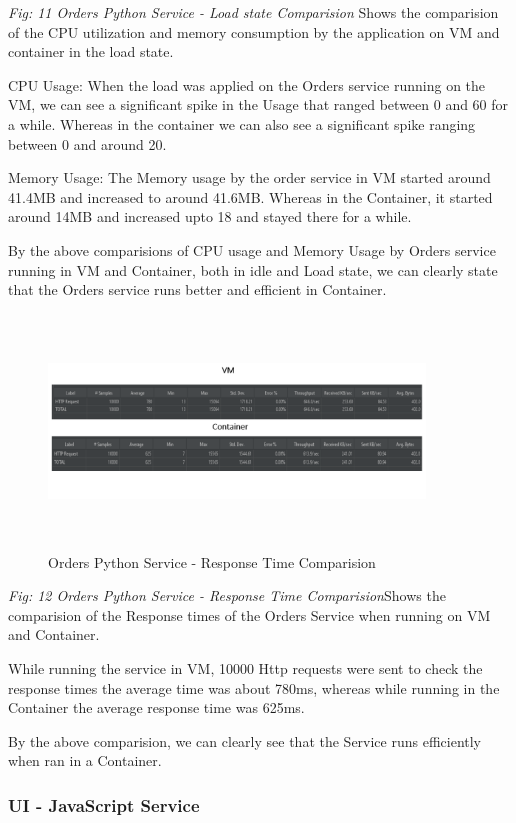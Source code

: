 \emph{Fig: 11 Orders Python Service - Load state Comparision} Shows the comparision of the CPU utilization and memory consumption by the application on VM and container in the load state.

CPU Usage: When the load was applied on the Orders service running on the VM, we can see a significant spike in the Usage that ranged between 0 and 60 for a while. Whereas in the container we can also see a significant spike ranging between 0 and around 20. 

Memory Usage:  The Memory usage by the order service in VM started around 41.4MB and increased to around 41.6MB. Whereas in the Container, it started around 14MB and increased upto 18 and stayed there for a while.

By the above comparisions of CPU usage and Memory Usage by Orders service running in VM and Container, both in idle and Load state, we can clearly state that the Orders service runs better and efficient in Container.

\begin{figure}[!h]
    \centering
    \includegraphics[width=10cm, height=6.2cm]{images/orders-response-comp.png}
    \caption{Orders Python Service - Response Time Comparision}
\end{figure}
\emph{Fig: 12 Orders Python Service - Response Time Comparision}Shows the comparision of the Response times of the Orders Service when running on VM and Container.

While running the service in VM, 10000 Http requests were sent to check the response times the average time was about 780ms, whereas while running in the Container the average response time was 625ms.

By the above comparision, we can clearly see that the Service runs efficiently when ran in a Container.  


\subsubsection{ UI - JavaScript Service}

